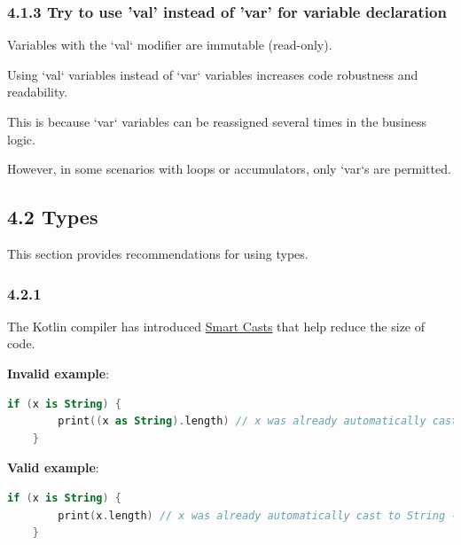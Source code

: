 {{{{\subsubsection*{\textbf{4.1.3 Try to use 'val' instead of 'var' for variable declaration}}
\leavevmode\newline

\label{sec:4.1.3}



Variables with the `val` modifier are immutable (read-only).

Using `val` variables instead of `var` variables increases code robustness and readability.

This is because `var` variables can be reassigned several times in the business logic.

However, in some scenarios with loops or accumulators, only `var`s are permitted.



\subsection*{\textbf{4.2 Types}}

\label{sec:4.2}

This section provides recommendations for using types.

\subsubsection*{\textbf{4.2.1}}
\leavevmode\newline

\label{sec:4.2.1}



The Kotlin compiler has introduced \href{https://kotlinlang.org/docs/reference/typecasts.html#smart-casts}{Smart Casts} that help reduce the size of code.



\textbf{Invalid example}:

\begin{lstlisting}[language=Kotlin]
    if (x is String) {
        print((x as String).length) // x was already automatically cast to String - no need to use 'as' keyword here
    }
\end{lstlisting}


\textbf{Valid example}:

\begin{lstlisting}[language=Kotlin]
    if (x is String) {
        print(x.length) // x was already automatically cast to String - no need to use 'as' keyword here
    }
\end{lstlisting}


}}}}
